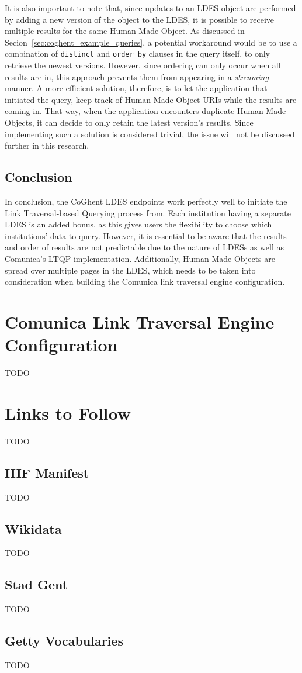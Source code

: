 It is also important to note that, since updates to an LDES object are performed by adding a new version of the object to the LDES, it is possible to receive multiple results for the same Human-Made Object. As discussed in Secion~\ref{sec:coghent_example_queries}, a potential workaround would be to use a combination of \texttt{distinct} and \texttt{order by} clauses in the query itself, to only retrieve the newest versions. However, since ordering can only occur when all results are in, this approach prevents them from appearing in a \textit{streaming} manner. A more efficient solution, therefore, is to let the application that initiated the query, keep track of Human-Made Object URIs while the results are coming in. That way, when the application encounters duplicate Human-Made Objects, it can decide to only retain the latest version's results. Since implementing such a solution is considered trivial, the issue will not be discussed further in this research.

\subsection{Conclusion}

In conclusion, the CoGhent LDES endpoints work perfectly well to initiate the Link Traversal-based Querying process from. Each institution having a separate LDES is an added bonus, as this gives users the flexibility to choose which institutions' data to query. However, it is essential to be aware that the results and order of results are not predictable due to the nature of LDESs as well as Comunica's LTQP implementation. Additionally, Human-Made Objects are spread over multiple pages in the LDES, which needs to be taken into consideration when building the Comunica link traversal engine configuration.

\section{Comunica Link Traversal Engine Configuration}
\label{sec:comunica_link_traversal_engine_configuration}

TODO

\section{Links to Follow}
\label{sec:links_to_follow}

TODO

\subsection{IIIF Manifest}
\label{subsec:links_to_follow_manifest}

TODO

\subsection{Wikidata}

TODO

\subsection{Stad Gent}

TODO

\subsection{Getty Vocabularies}

TODO